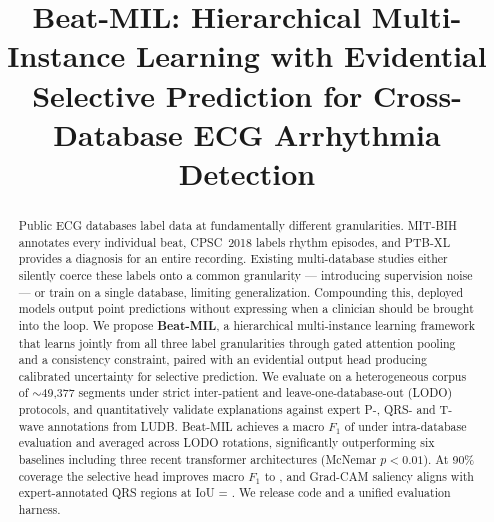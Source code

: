 \documentclass[conference]{IEEEtran}
\begin{document}
\title{Beat-MIL: Hierarchical Multi-Instance Learning with Evidential Selective Prediction for Cross-Database ECG Arrhythmia Detection}

\author{
}

\maketitle

\begin{abstract}
Public ECG databases label data at fundamentally different granularities. MIT-BIH annotates every individual beat, CPSC~2018 labels rhythm episodes, and PTB-XL provides a diagnosis for an entire recording. Existing multi-database studies either silently coerce these labels onto a common granularity --- introducing supervision noise --- or train on a single database, limiting generalization. Compounding this, deployed models output point predictions without expressing when a clinician should be brought into the loop. We propose \textbf{Beat-MIL}, a hierarchical multi-instance learning framework that learns jointly from all three label granularities through gated attention pooling and a consistency constraint, paired with an evidential output head producing calibrated uncertainty for selective prediction. We evaluate on a heterogeneous corpus of $\sim$49{,}377 segments under strict inter-patient and leave-one-database-out (LODO) protocols, and quantitatively validate explanations against expert P-, QRS- and T-wave annotations from LUDB. Beat-MIL achieves a macro $F_1$ of \unskip{} under intra-database evaluation and \unskip{} averaged across LODO rotations, significantly outperforming six baselines including three recent transformer architectures (McNemar $p<0.01$). At 90\% coverage the selective head improves macro $F_1$ to \unskip{}, and Grad-CAM saliency aligns with expert-annotated QRS regions at IoU = \unskip{}. We release code and a unified evaluation harness.
\end{abstract}
\end{document}
